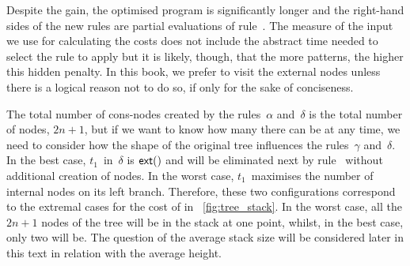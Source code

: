 Despite the gain, the optimised program is significantly longer and
the right\hyp{}hand sides of the new rules are partial
evaluations of
rule~\clause{\delta}. The measure of the input we use for calculating
the costs does not include the abstract time needed to select the rule
to apply but it is likely, though, that the more patterns, the higher
this hidden penalty. In this book, we prefer to visit the external
nodes unless there is a logical reason not to do so, if only for the
sake of conciseness.

The total number of cons\hyp{}nodes created by the
rules~\(\alpha\) and~\(\delta\) is the total number of nodes,
\(2n+1\), but if we want to know how many there can be at any time, we
need to consider how the shape of the original tree influences the
rules~\(\gamma\) and~\(\delta\). In the best case,
\(t_1\)~in~\(\delta\) is \(\textsf{ext}()\) and will be eliminated next
by rule~\clause{\gamma} without additional creation of nodes. In the
worst case, \(t_1\)~maximises the number of internal nodes on its left
branch. Therefore, these two configurations correspond to the extremal
cases for the cost of 
in \fig~\vref{fig:tree_stack}. In the worst case, all the \(2n+1\)
nodes of the tree will be in the stack at one point, whilst, in the
best case, only two will be. The question of the average stack size
will be considered later in this text in relation with the average
height.

